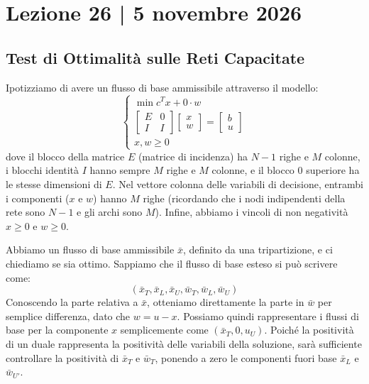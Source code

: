\documentclass[12pt, a4paper]{article}
\begin{document}
	\section*{Lezione 26 | 5 novembre 2026}
	\subsection*{Test di Ottimalità sulle Reti Capacitate}
	
	Ipotizziamo di avere un flusso di base ammissibile attraverso il modello:
	\[
	\begin{cases}
		\min c^T x + 0 \cdot w \\
		\begin{bmatrix}
			E & 0 \\
			I & I
		\end{bmatrix}
		\begin{bmatrix}
			x \\
			w
		\end{bmatrix}
		=
		\begin{bmatrix}
			b \\
			u
		\end{bmatrix}\\
		x,w \geq 0
	\end{cases}
	\]
	dove il blocco della matrice $E$ (matrice di incidenza) ha $N-1$ righe e $M$ colonne, i blocchi identità $I$ hanno sempre $M$ righe e $M$ colonne, e il blocco $0$ superiore ha le stesse dimensioni di $E$. Nel vettore colonna delle variabili di decisione, entrambi i componenti ($x$ e $w$) hanno $M$ righe (ricordando che i nodi indipendenti della rete sono $N-1$ e gli archi sono $M$). Infine, abbiamo i vincoli di non negatività $x \ge 0$ e $w \ge 0$.
	
	Abbiamo un flusso di base ammissibile $\bar{x}$, definito da una tripartizione, e ci chiediamo se sia ottimo. 
	Sappiamo che il flusso di base esteso si può scrivere come:
	\[
	(\bar{x}_T, \bar{x}_L, \bar{x}_U, \bar{w}_T, \bar{w}_L, \bar{w}_U)
	\]
	Conoscendo la parte relativa a $\bar{x}$, otteniamo direttamente la parte in $\bar{w}$ per semplice differenza, dato che $w = u - x$. Possiamo quindi rappresentare i flussi di base per la componente $x$ semplicemente come $(\bar{x}_T, 0, u_U)$. 
	Poiché la positività di un duale rappresenta la positività delle variabili della soluzione, sarà sufficiente controllare la positività di $\bar{x}_T$ e $\bar{w}_T$, ponendo a zero le componenti fuori base $\bar{x}_L$ e $\bar{w}_{U'}$.
	
\end{document}
